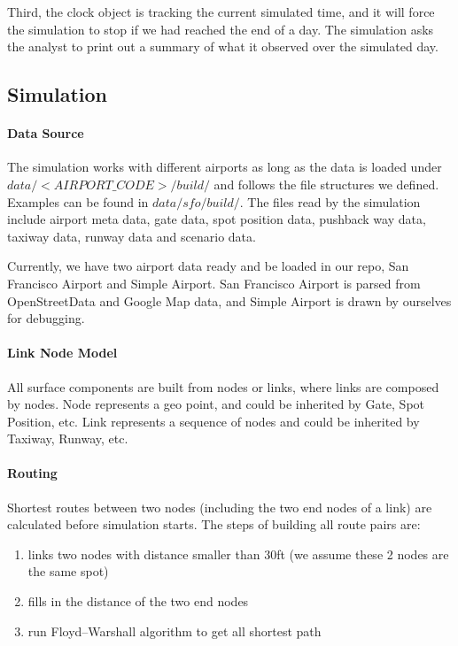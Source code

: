 \documentclass[conference]{IEEEtran}
\begin{document}
Third, the clock object is tracking the current simulated time, and it will force the simulation to stop if we had reached the end of a day. The simulation asks the analyst to print out a summary of what it observed over the simulated day.


\subsection{Simulation}

\paragraph{Data Source}

The simulation works with different airports as long as the data is loaded under $data/<AIRPORT\_CODE>/build/$ and follows the file structures we defined. Examples can be found in $data/sfo/build/$. The files read by the simulation include airport meta data, gate data, spot position data, pushback way data, taxiway data, runway data and scenario data.

Currently, we have two airport data ready and be loaded in our repo, San Francisco Airport and Simple Airport. San Francisco Airport is parsed from OpenStreetData and Google Map data, and Simple Airport is drawn by ourselves for debugging.

\paragraph{Link Node Model}

All surface components are built from nodes or links, where links are composed by nodes. Node represents a geo point, and could be inherited by Gate, Spot Position, etc. Link represents a sequence of nodes and could be inherited by Taxiway, Runway, etc.

\paragraph{Routing}
Shortest routes between two nodes (including the two end nodes of a link) are calculated before simulation starts. The steps of building all route pairs are:

\begin{enumerate}
    \item links two nodes with distance smaller than 30ft (we assume these 2 nodes are the same spot)
    \item fills in the distance of the two end nodes
    \item run Floyd–Warshall algorithm to get all shortest path
\end{enumerate}
\end{document}
